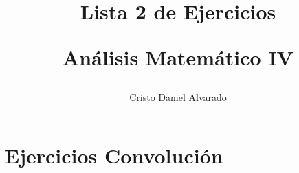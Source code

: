 \documentclass[12pt]{report}
\newcounter{it}
\theoremstyle{largebreak}
\begin{document}
    \setlength{\parskip}{5pt} %
    \setlength{\parindent}{12pt} %
    \title{Lista 2 de Ejercicios 
    
    Análisis Matemático IV
    }
    \author{Cristo Daniel Alvarado}
    \maketitle

    \tableofcontents %

    
    \chapter{Ejercicios Convolución}
    
    \setcounter{section}{1}

    \renewcommand{\theenumi}{\roman{enumi}}
\end{document}
